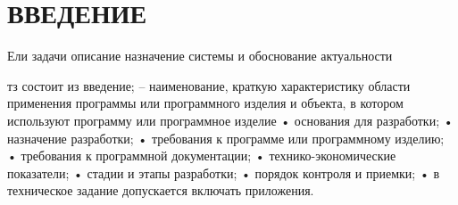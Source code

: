 \section*{ВВЕДЕНИЕ}



Ели задачи описание назначение системы и обоснование актуальности

тз состоит из 
введение;
-- наименование, краткую характеристику области
применения программы или программного изделия и объекта, в котором используют
программу или программное изделие
• основания для разработки;
• назначение разработки;
• требования к программе или программному изделию;
• требования к программной документации;
• технико-экономические показатели;
• стадии и этапы разработки;
• порядок контроля и приемки;
• в техническое задание допускается включать приложения. 



\pagebreak




















